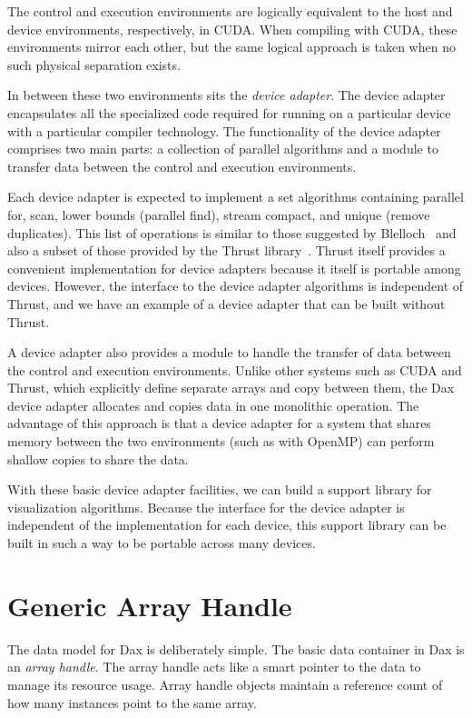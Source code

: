 \documentclass[conference]{IEEEtran}
\newcommand*{\lcite}[1]{~\cite{#1}}
\newcommand*{\scite}[1]{~\cite{#1}}
\newcommand*{\keyterm}[1]{\emph{#1}}
\begin{document}
The control and execution environments are logically equivalent to the host
and device environments, respectively, in CUDA.  When compiling with CUDA,
these environments mirror each other, but the same logical approach is
taken when no such physical separation exists.

In between these two environments sits the \keyterm{device adapter}.  The
device adapter encapsulates all the specialized code required for running
on a particular device with a particular compiler technology.  The
functionality of the device adapter comprises two main parts: a collection
of parallel algorithms and a module to transfer data between the control
and execution environments.

Each device adapter is expected to implement a set algorithms containing
parallel for, scan, lower bounds (parallel find), stream compact, and unique
(remove duplicates).  This list of operations is similar to those suggested
by Blelloch\scite{Blelloch1990} and also a subset of those provided by the
Thrust library\lcite{Thrust}.  Thrust itself provides a convenient
implementation for device adapters because it itself is portable among
devices.  However, the interface to the device adapter algorithms is
independent of Thrust, and we have an example of a device adapter that can
be built without Thrust.

A device adapter also provides a module to handle the transfer of data
between the control and execution environments.  Unlike other systems such as
CUDA and Thrust, which explicitly define separate arrays and copy between
them, the Dax device adapter allocates and copies data in one monolithic
operation.  The advantage of this approach is that a device adapter for a
system that shares memory between the two environments (such as with
OpenMP) can perform shallow copies to share the data.

With these basic device adapter facilities, we can build a support library
for visualization algorithms.  Because the interface for the device adapter
is independent of the implementation for each device, this support library
can be built in such a way to be portable across many devices.

\section{Generic Array Handle}
\label{sec:GenericArrayHandle}

\noindent
The data model for Dax is deliberately simple.  The basic data container in
Dax is an \keyterm{array handle}.  The array handle acts like a smart
pointer to the data to manage its resource usage.  Array handle objects
maintain a reference count of how many instances point to the same array.
\end{document}
